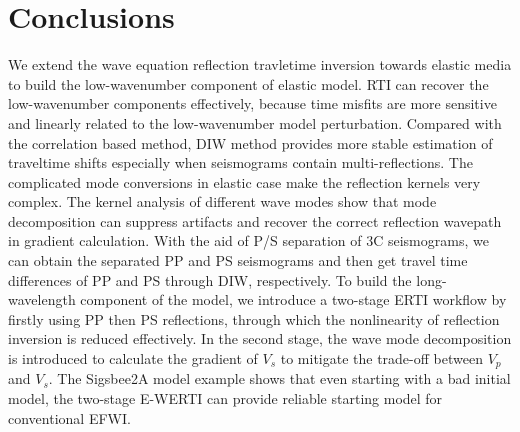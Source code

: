\section{Conclusions}
We extend the wave equation reflection travletime inversion towards elastic media to build the
low-wavenumber
component of elastic model. 
RTI can recover the low-wavenumber components effectively, because time misfits are more sensitive
and linearly related to the low-wavenumber model perturbation. 
Compared with the correlation based method, DIW method provides more stable estimation of traveltime shifts 
especially when seismograms contain multi-reflections.
The complicated mode conversions in elastic case make the reflection kernels very complex.
The kernel analysis of different wave modes show that mode decomposition can 
suppress artifacts and recover the correct reflection wavepath in gradient calculation.
With the aid of 
P/S separation of 3C seismograms, we can obtain the separated PP and PS seismograms and then get
travel time differences of PP and PS through DIW, respectively. 
To build the long-wavelength component of the model, we introduce a two-stage ERTI
workflow by firstly using PP then PS reflections, through which the nonlinearity of reflection
inversion is reduced effectively. 
In the second stage, the wave mode
decomposition is introduced to calculate the gradient of $V_s$ to mitigate the trade-off between
$V_p$ and $V_s$.
The Sigsbee2A model example shows that even starting with a bad initial model, the
two-stage E-WERTI can provide reliable starting model for conventional EFWI. 

